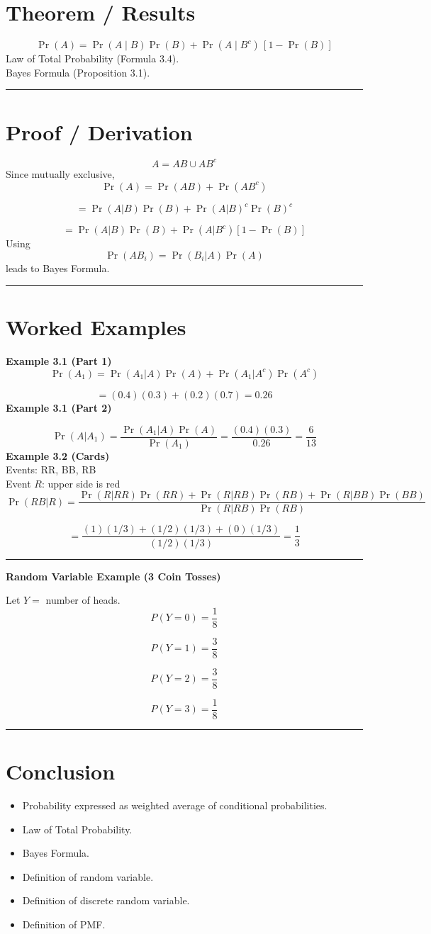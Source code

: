 \documentclass[12pt]{article}
\begin{document}
\section*{Theorem / Results}
\[
\Pr(A) = \Pr(A \mid B)\Pr(B) + \Pr(A \mid B^c)\,[1 - \Pr(B)]
\]
Law of Total Probability (Formula 3.4). \\
Bayes Formula (Proposition 3.1).\\
\noindent\rule{\textwidth}{0.6pt}
\section*{Proof / Derivation}
\[
A = AB \cup AB^c
\]
Since mutually exclusive,
\[
\Pr(A) = \Pr(AB) + \Pr(AB^c)
\]

\[
= \Pr(A|B)\Pr(B) + \Pr(A|B)^c \Pr(B)^c
\]

\[
= \Pr(A|B)\Pr(B) + \Pr(A|B^c)[1 - \Pr(B)]
\]
Using
\[
\Pr(AB_i) = \Pr(B_i|A)\Pr(A)
\]
leads to Bayes Formula.\\
\noindent\rule{\textwidth}{0.6pt}
\section*{Worked Examples}

\textbf{Example 3.1 (Part 1)}
\[
\Pr(A_1) = \Pr(A_1|A)\Pr(A) + \Pr(A_1|A^c)\Pr(A^c)
\]

\[
= (0.4)(0.3) + (0.2)(0.7) = 0.26
\]
\textbf{Example 3.1 (Part 2)}

\[
\Pr(A|A_1) =
\frac{\Pr(A_1|A)\Pr(A)}{\Pr(A_1)}
= \frac{(0.4)(0.3)}{0.26}
= \frac{6}{13}
\]
\textbf{Example 3.2 (Cards)}\\
Events: RR, BB, RB\\
Event $R$: upper side is red
\[
\Pr(RB|R) =
\frac{\Pr(R|RR)\Pr(RR) + \Pr(R|RB)\Pr(RB) + \Pr(R|BB)\Pr(BB)}
{\Pr(R|RB)\Pr(RB)}
\]

\[
= \frac{(1)(1/3) + (1/2)(1/3) + (0)(1/3)}
{(1/2)(1/3)}
= \frac{1}{3}
\]
\noindent\rule{\textwidth}{0.6pt}
\textbf{Random Variable Example (3 Coin Tosses)}

Let $Y =$ number of heads.
\[
P(Y=0) = \frac{1}{8}
\]

\[
P(Y=1) = \frac{3}{8}
\]

\[
P(Y=2) = \frac{3}{8}
\]

\[
P(Y=3) = \frac{1}{8}
\]
\noindent\rule{\textwidth}{0.6pt}
\section*{Conclusion}
\begin{itemize}
\item Probability expressed as weighted average of conditional probabilities.
\item Law of Total Probability.
\item Bayes Formula.
\item Definition of random variable.
\item Definition of discrete random variable.
\item Definition of PMF.
\end{itemize}
\end{document}
